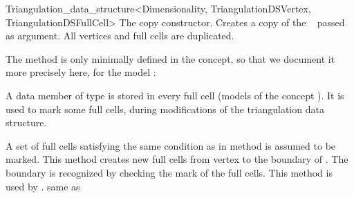 \begin{ccRefClass}{Triangulation_data_structure<Dimensionality, TriangulationDSVertex, TriangulationDSFullCell>}
{The copy constructor. Creates a copy of the \ccRefName\  passed as
    argument. All vertices and full cells are duplicated.}

\begin{ccDebug}

The  method is only minimally defined in the
 concept, so that we document it more precisely
here, for the model \ccRefName:


\end{ccDebug}

\begin{ccAdvanced}

\ccTypes

{A data member of type  is stored in every full cell (models
of the concept ).  It is used to mark
some 
full cells, during modifications of the triangulation data structure.}


{A set  of full cells satisfying the same condition as in method
\ccRefName{} is assumed to be marked. This
method creates new full cells from vertex  to the boundary of .
The boundary is recognized by checking the mark of the full cells.
This method is used by \ccRefName{}.
\ccPrecond same as \ccRefName{} 
}

\end{ccAdvanced}

\ccSeeAlso

\\
\\

\end{ccRefClass}
